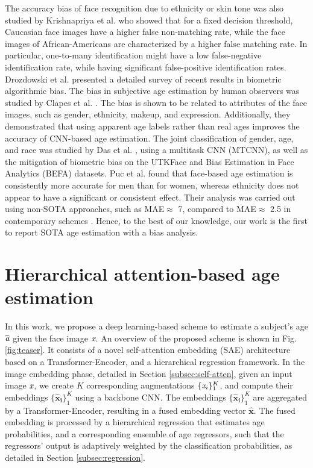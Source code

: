 \documentclass[10pt,journal]{IEEEtran}\usepackage{amsfonts}
\begin{document}
The accuracy bias of face recognition due to ethnicity or skin tone was also
studied by Krishnapriya et al. \cite{9001031} who showed that for a fixed
decision threshold, Caucasian face images have a higher false non-matching
rate, while the face images of African-Americans are characterized by a higher
false matching rate. In particular, one-to-many identification might have a
low false-negative identification rate, while having significant
false-positive identification rates. Drozdowski et al. \cite{9086771}
presented a detailed survey of recent results in biometric algorithmic bias.
The bias in subjective age estimation by human observers was studied by Clapes
et al. \cite{8575487}. The bias is shown to be related to attributes of the
face images, such as gender, ethnicity, makeup, and expression. Additionally,
they demonstrated that using apparent age labels rather than real ages
improves the accuracy of CNN-based age estimation. The joint classification of
gender, age, and race was studied by Das et al. \cite{Das_2018_ECCV_Workshops}, using a multitask CNN (MTCNN), as well as the mitigation of biometric bias
on the UTKFace and Bias Estimation in Face Analytics (BEFA) datasets. Puc et
al. \cite{9287219} found that face-based age estimation is consistently more
accurate for men than for women, whereas ethnicity does not appear to have a
significant or consistent effect. Their analysis was carried out using
non-SOTA approaches, such as MAE$\approx$ 7, compared to MAE$\approx$ 2.5 in
contemporary schemes \cite{1613043}. Hence, to the best of our knowledge, our
work is the first to report SOTA age estimation with a bias analysis.

\section{Hierarchical attention-based age estimation}

\label{sec:Proposed Method}

In this work, we propose a deep learning-based scheme to estimate a subject's
age $\widehat{\emph{a}}$ given the face image $\emph{x}$. An overview of the
proposed scheme is shown in Fig. \ref{fig:teaser}. It consists of a novel
self-attention embedding (SAE) architecture based on a Transformer-Encoder,
and a hierarchical regression framework. In the image embedding phase,
detailed in Section \ref{subsec:self-atten}, given an input image $\emph{x}$,
we create $K$ corresponding augmentations $\{\emph{x}_{i}\}_{1}^{K}$, and
compute their embeddings $\mathbf{\{\hat{x}_{i}\}}_{1}^{K}$ using a backbone
CNN. The embeddings $\mathbf{\{\hat{x}_{i}\}}_{1}^{K}$ are aggregated by a
Transformer-Encoder, resulting in a fused embedding vector $\mathbf{\hat{x}}$.
The fused embedding is processed by a hierarchical regression that estimates
age probabilities, and a corresponding ensemble of age regressors, such that
the regressors' output is adaptively weighted by the classification
probabilities, as detailed in Section \ref{subsec:regression}.
\end{document}
